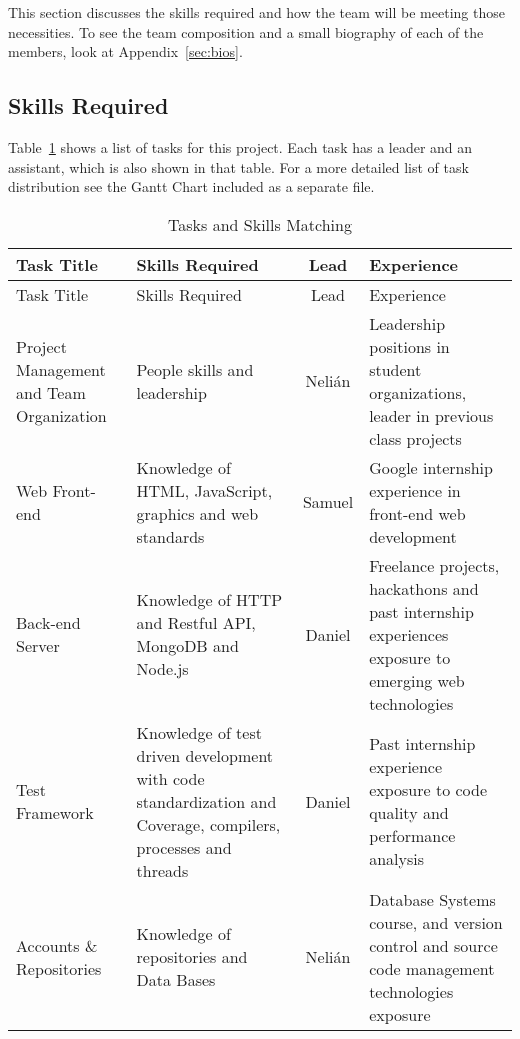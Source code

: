 
This section discusses the skills required and how  the team will be meeting
those necessities. To see the team composition and a small biography of each of
the members, look at Appendix~\ref{sec:bios}.

\subsection{Skills Required}

Table~\ref{skills} shows a list of tasks for this project. Each task has a leader
and an assistant, which is also shown in that table. For a more detailed list of
task distribution see the
Gantt Chart included as a separate file.

\begin{center}
\setlength{\extrarowheight}{1.5pt}
  \begin{longtable}{|m{3cm}|m{5cm}|c|m{5cm}|}
 \caption{Tasks and Skills Matching \label{skills}} \\
   \hline
  
  \centering Task Title & Skills Required & Lead & Experience \\
  \hline \hline \endfirsthead
  
     \hline

	\centering Task Title & Skills Required & Lead & Experience \\  
	\hline \hline \endhead
  
  \endfoot  
  
  Project Management and Team Organization & People skills and leadership & Nelián & Leadership positions in student organizations, leader in previous class projects\\ \hline
  Web Front-end & Knowledge of HTML, JavaScript, graphics and web standards & Samuel & Google internship experience in front-end web development\\ \hline
  Back-end Server & Knowledge of HTTP and Restful API, MongoDB and Node.js & Daniel & Freelance projects, hackathons and past internship experiences exposure to emerging web technologies \\ \hline
  Test Framework & Knowledge of test driven development with code standardization and Coverage, compilers, processes and threads & Daniel & Past internship experience exposure to code quality and performance analysis\\ \hline
  Accounts \& Repositories & Knowledge of repositories and Data Bases & Nelián & Database Systems course, and version control and source code management
technologies exposure\\ \hline
   \end{longtable}
\end{center}

